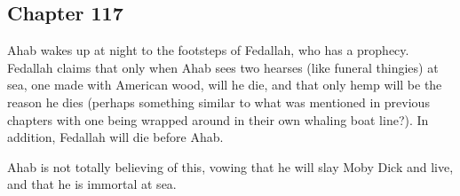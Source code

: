 \subsection{Chapter 117}

Ahab wakes up at night to the footsteps of Fedallah, who has a prophecy.
Fedallah claims that only when Ahab sees two hearses (like funeral thingies) at
sea, one made with American wood, will he die, and that only hemp will be the
reason he dies (perhaps something similar to what was mentioned in previous
chapters with one being wrapped around in their own whaling boat line?). In
addition, Fedallah will die before Ahab.

Ahab is not totally believing of this, vowing that he will slay Moby Dick and live, and that he is immortal at sea.
